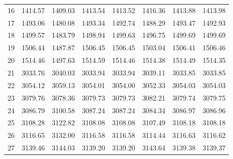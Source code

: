 \documentclass[10pt,oneside]{article}
\begin{document}
\begin{table}[h!]
\begin{tabular}{cccccccc}
16 &   1414.57 & 1409.03 & 1413.54 & 1413.52 &      1416.36 & 1413.88 & 1413.98 \\
17 &   1493.06 & 1480.08 & 1493.34 & 1492.74 &      1488.29 & 1493.47 & 1492.93 \\
18 &   1499.57 & 1483.79 & 1498.94 & 1499.63 &      1496.75 & 1499.69 & 1499.69 \\
19 &   1506.44 & 1487.87 & 1506.45 & 1506.45 &      1503.04 & 1506.41 & 1506.46 \\
20 &   1514.46 & 1497.63 & 1514.59 & 1514.46 &      1514.38 & 1514.49 & 1514.35 \\
21 &   3033.76 & 3040.03 & 3033.94 & 3033.94 &      3039.11 & 3033.85 & 3033.85 \\
22 &   3054.12 & 3059.13 & 3054.01 & 3054.00 &      3052.33 & 3054.03 & 3054.03 \\
23 &   3079.76 & 3078.36 & 3079.73 & 3079.73 &      3082.21 & 3079.74 & 3079.75 \\
24 &   3086.79 & 3100.58 & 3087.24 & 3087.24 &      3084.34 & 3086.97 & 3086.96 \\
25 &   3108.28 & 3122.82 & 3108.08 & 3108.08 &      3107.49 & 3108.18 & 3108.18 \\
26 &   3116.65 & 3132.00 & 3116.58 & 3116.58 &      3114.44 & 3116.63 & 3116.62 \\
27 &   3139.46 & 3144.03 & 3139.20 & 3139.20 &      3143.64 & 3139.38 & 3139.37 \\
\bottomrule
\end{tabular}
\end{table}

\clearpage
\end{document}
